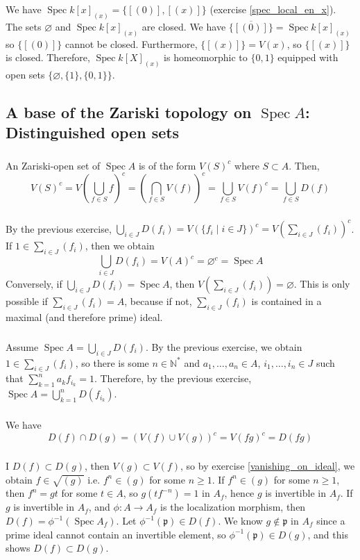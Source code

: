 \documentclass{article}
\newcommand{\N}{\mathbb{N}}
\DeclareMathOperator{\Spec}{Spec}
\newcommand{\p}{\mathfrak{p}}
\newcommand{\exercise}{\subsubsection} %
\begin{document}
\exercise{} We have $\Spec k[x]_{(x)} = \{[(0)],[(x)]\}$ (exercise \ref{spec_local_en_x}). The sets $\varnothing$ and $\Spec k[x]_{(x)}$ are closed. We have $\overline{\{[(0)]\}} = \Spec k[x]_{(x)}$ so $\{[(0)]\}$ cannot be closed. Furthermore, $\{[(x)]\} = V(x)$, so $\{[(x)]\}$ is closed. Therefore, $\Spec k[X]_{(x)}$ is homeomorphic to $\{0,1\}$ equipped with open sets $\{\varnothing, \{1\}, \{0,1\}\}$.

\subsection{A base of the Zariski topology on $\Spec A$: Distinguished open sets}

\exercise{} An Zariski-open set of $\Spec A$ is of the form $V(S)^c$ where $S \subset A$. Then,
\[V(S)^c = V\left(\bigcup_{f \in S} f\right)^c = \left(\bigcap_{f \in S} V(f)\right)^c = \bigcup_{f \in S} V(f)^c = \bigcup_{f \in S} D(f)\]

\exercise{} By the previous exercise, $\bigcup_{i \in J} D(f_i) = V(\{f_i \mid i\in J\})^c = V(\sum_{i\in J} (f_i))^c$. If $1 \in \sum_{i\in J} (f_i)$, then we obtain
\[\bigcup_{i \in J} D(f_i) = V(A)^c = \varnothing^c = \Spec A\]
Conversely, if $\bigcup_{i \in J} D(f_i) = \Spec A$, then $V(\sum_{i\in J} (f_i)) = \varnothing$. This is only possible if $\sum_{i\in J} (f_i) = A$, because if not, $\sum_{i\in J} (f_i)$ is contained in a maximal (and therefore prime) ideal.

\exercise{} \label{distinguished_quasicompact} Assume $\Spec A = \bigcup_{i\in J} D(f_i)$. By the previous exercise, we obtain $1 \in \sum_{i\in J} (f_i)$, so there is some $n \in \N^*$ and $a_1, \dots,a_n \in A$, $i_1, \dots,i_n \in J$ such that $\sum_{k=1}^n a_k f_{i_k} = 1$. Therefore, by the previous exercise, $\Spec A = \bigcup_{k = 1}^n D(f_{i_k})$.

\exercise{} We have
\[D(f) \cap D(g) = (V(f) \cup V(g))^c = V(fg)^c = D(fg)\]

\exercise{} I $D(f) \subset D(g)$, then $V(g) \subset V(f)$, so by exercise \ref{vanishing_on_ideal}, we obtain $f \in \sqrt{(g)}$ i.e. $f^n \in (g)$ for some $n \ge 1$. If $f^n \in (g)$ for some $n \ge 1$, then $f^n = gt$ for some $t \in A$, so $g(tf^{-n}) = 1$ in $A_f$, hence $g$ is invertible in $A_f$. If $g$ is invertible in $A_f$, and $\phi : A \to A_f$ is the localization morphism, then $D(f) = \phi^{-1}(\Spec A_f)$. Let $\phi^{-1}(\p) \in D(f)$. We know $g \notin \p$ in $A_f$ since a prime ideal cannot contain an invertible element, so $\phi^{-1}(\p) \in D(g)$, and this shows $D(f) \subset D(g)$.
\end{document}
